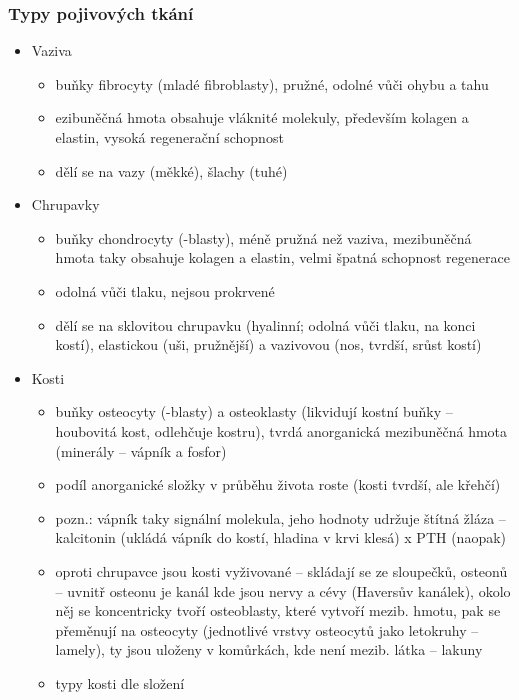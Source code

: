 \documentclass{article}
\begin{document}
\subsubsection{Typy pojivových tkání}
\begin{itemize}
  \item Vaziva
  \begin{itemize}
    \item buňky fibrocyty (mladé fibroblasty), pružné, odolné vůči ohybu a tahu
    \item ezibuněčná hmota obsahuje vláknité molekuly, především kolagen a elastin, vysoká regenerační schopnost
    \item dělí se na vazy (měkké), šlachy (tuhé)
  \end{itemize}
  \item Chrupavky
  \begin{itemize}
    \item buňky chondrocyty (-blasty), méně pružná než vaziva, mezibuněčná hmota taky obsahuje kolagen a elastin, velmi špatná schopnost regenerace
    \item odolná vůči tlaku, nejsou prokrvené
    \item dělí se na sklovitou chrupavku (hyalinní; odolná vůči tlaku, na konci kostí), elastickou (uši, pružnější) a vazivovou (nos, tvrdší, srůst kostí)
  \end{itemize}
  \item Kosti
  \begin{itemize}
    \item buňky osteocyty (-blasty) a osteoklasty (likvidují kostní buňky -- houbovitá kost, odlehčuje kostru), tvrdá anorganická mezibuněčná hmota (minerály -- vápník a fosfor)
    \item podíl anorganické složky v průběhu života roste (kosti tvrdší, ale křehčí)
    \item pozn.: vápník taky signální molekula, jeho hodnoty udržuje štítná žláza -- kalcitonin (ukládá vápník do kostí, hladina v krvi klesá) x PTH (naopak)
    \item oproti chrupavce jsou kosti vyživované -- skládají se ze sloupečků, osteonů -- uvnitř osteonu je kanál kde jsou nervy a cévy (Haversův kanálek), okolo něj se koncentricky tvoří osteoblasty, které vytvoří mezib. hmotu, pak se přeměnují na osteocyty (jednotlivé vrstvy osteocytů jako letokruhy -- lamely), ty jsou uloženy v komůrkách, kde není mezib. látka -- lakuny
    \item typy kosti dle složení
    \begin{itemize}

\end{itemize}
\end{itemize}
\end{itemize}
\end{document}
